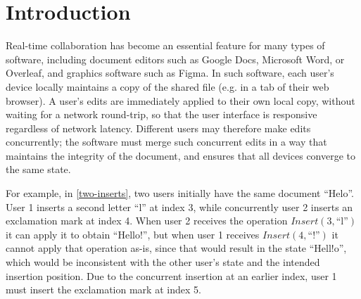 \documentclass[sigplan,10pt]{acmart}
\begin{document}

\maketitle

\section{Introduction}\label{introduction}

Real-time collaboration has become an essential feature for many types of software, including document editors such as Google Docs, Microsoft Word, or Overleaf, and graphics software such as Figma.
In such software, each user's device locally maintains a copy of the shared file (e.g. in a tab of their web browser).
A user's edits are immediately applied to their own local copy, without waiting for a network round-trip, so that the user interface is responsive regardless of network latency.
Different users may therefore make edits concurrently; the software must merge such concurrent edits in a way that maintains the integrity of the document, and ensures that all devices converge to the same state.

For example, in \autoref{two-inserts}, two users initially have the same document ``Helo''.
User 1 inserts a second letter ``l'' at index 3, while concurrently user 2 inserts an exclamation mark at index 4.
When user 2 receives the operation $\mathit{Insert}(3, \text{``l''})$ it can apply it to obtain ``Hello!'', but when user 1 receives $\mathit{Insert}(4, \text{``!''})$ it cannot apply that operation as-is, since that would result in the state ``Hell!o'', which would be inconsistent with the other user's state and the intended insertion position.
Due to the concurrent insertion at an earlier index, user 1 must insert the exclamation mark at index 5.
\end{document}
